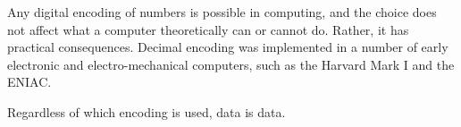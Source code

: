 \begin{tcolorbox}[breakable, enhanced, colback=textbook-blue, sharp corners]
	\begin{center}
	\end{center}
	
	
	Any digital encoding of numbers is possible in computing, and the choice does not affect what a computer theoretically can or cannot do. Rather, it has practical consequences. Decimal encoding was implemented in a number of early electronic and electro-mechanical computers, such as the Harvard Mark I and the ENIAC. 
	
	
	
	\vspace{3mm}
\end{tcolorbox}
\vspace{2\baselineskip}



Regardless of which encoding is used, data is data.




